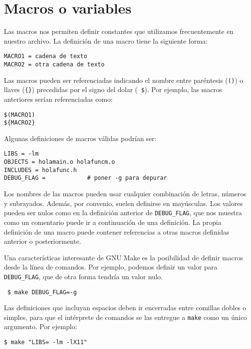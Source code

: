 \section{Macros o variables}

Las macros nos permiten definir constantes que utilizamos frecuentemente
en nuestro archivo. La definición de una macro tiene la siguiente forma:

\begin{verbatim}
MACRO1 = cadena de texto
MACRO2 = otra cadena de texto
\end{verbatim}

Las macros pueden ser referenciadas indicando el nombre entre paréntesis
({\tt ()}) o llaves ({\tt \{\}}) precedidas por el signo del dolar ({\tt
\$}). Por ejemplo, las macros anteriores serían referenciadas como:

\begin{verbatim}
$(MACRO1)
${MACRO2}
\end{verbatim}

Algunas definiciones de macros válidas podrían ser:

\begin{verbatim}
LIBS = -lm
OBJECTS = holamain.o holafuncm.o
INCLUDES = holafunc.h
DEBUG_FLAG =            # poner -g para depurar
\end{verbatim}

Los nombres de las macros pueden usar cualquier combinación de letras,
números y subrayados. Además, por convenio, suelen definirse en
mayúsculas. Los valores pueden ser nulos como en la definición anterior
de {\tt DEBUG\_FLAG}, que nos muestra como un comentario puede ir a
continuación de una definición. La propia definición de una macro puede
contener referencias a otras macros definidas anterior o posteriormente.

Una características interesante de {\sf GNU Make} es la posibilidad de
definir macros desde la línea de comandos. Por ejemplo, podemos definir
un valor para {\tt DEBUG\_FLAG}, que de otra forma tendría un valor
nulo.

\begin{verbatim} $ make DEBUG_FLAG=-g \end{verbatim}

Las definiciones que incluyan espacios deben ir encerradas entre
comillas dobles o simples, para que el intérprete de comandos se las
entregue a {\tt make} como un único argumento. Por ejemplo:

\begin{verbatim}
$ make "LIBS= -lm -lX11"
\end{verbatim}

